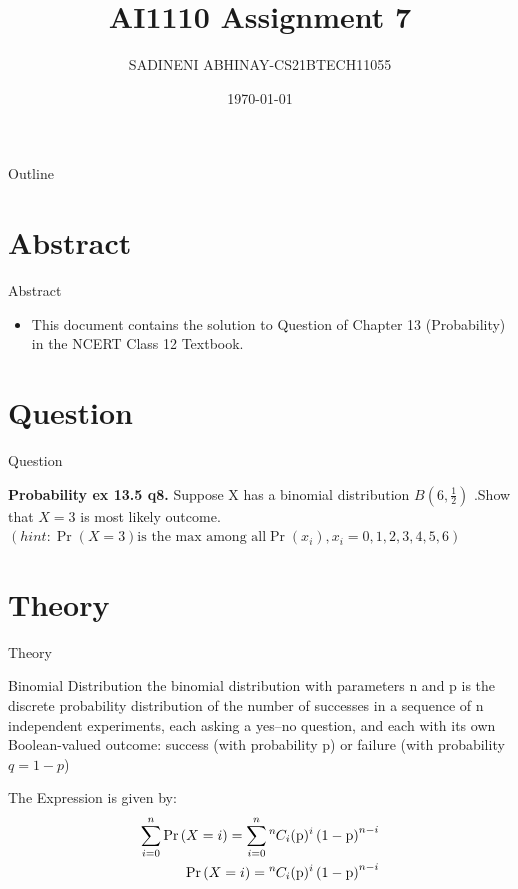 \documentclass{beamer}
\title{AI1110 Assignment 7}
\author{SADINENI ABHINAY-CS21BTECH11055}
\date{\today}
\providecommand{\pr}[1]{\ensuremath{\Pr\left(#1\right)}}
\providecommand{\brak}[1]{\ensuremath{\left(#1\right)}}
\newcommand*{\permcomb}[4][0mu]{{{}^{#3}\mkern#1#2_{#4}}}
\newcommand*{\comb}[1][-1mu]{\permcomb[#1]{C}}
\begin{document}
	
	\begin{frame}
		\titlepage
	\end{frame}

\begin{frame}{Outline}
  \tableofcontents
\end{frame}

\section{Abstract}
	\begin{frame}{Abstract}
		\begin{itemize}
			\item 	This document contains the solution to Question of Chapter 13 (Probability) in the NCERT Class 12 Textbook.
		\end{itemize}
	\end{frame}
	
	\section{Question}
	\begin{frame}{Question}
		\begin{block}{\textbf{Probability  ex 13.5 q8.}}
			 Suppose X has a binomial distribution $B\brak{6,\frac{1}{2}}$ .Show that $X=3$ is most likely outcome.
			 \brak{hint: \pr{X=3} \text{is the max among all} \pr{x_i}, x_{i}=0,1,2,3,4,5,6}
		\end{block}
	\end{frame}
	

	\section{Theory}
	\begin{frame}{Theory}
			 \begin{block}{Binomial Distribution}
	      the binomial distribution with parameters n and p is the discrete probability distribution of the number of successes in a sequence of n independent experiments, each asking a yes–no question, and each with its own Boolean-valued outcome: success (with probability p) or failure (with probability $q = 1 − p$)
		\end{block}	   
			      The Expression is given by:
\begin{align}
\sum_{i=0}^{n}\pr{X = i} =  \sum_{i=0}^{n} \comb{n}{i}(\text{p})^i\left(1-\text{p}\right)^{n-i}
\\
\pr{X = i} =\comb{n}{i}(\text{p})^i\left(1-\text{p}\right)^{n-i}
	      \end{align}
	\end{frame}
\end{document}
